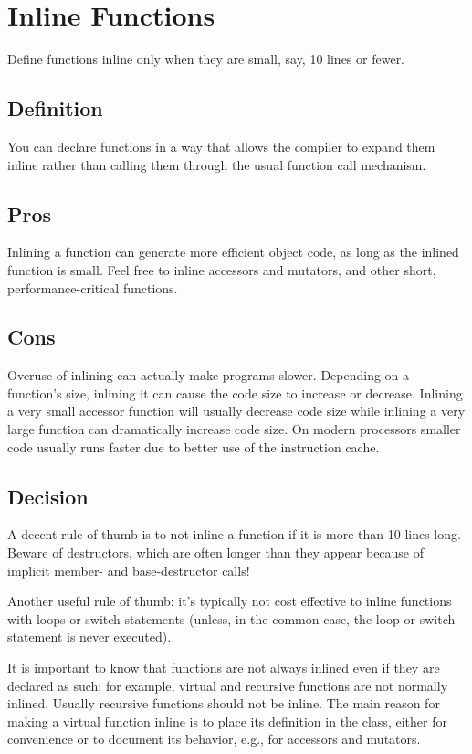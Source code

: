 
\section{Inline Functions}\label{sec:inline-functions}
Define functions inline only when they are small, say, 10 lines or fewer.
\subsection{Definition}
You can declare functions in a way that allows the compiler to expand them inline rather than calling them through the usual function call mechanism.
\subsection{Pros}
Inlining a function can generate more efficient object code, as long as the inlined function is small. Feel free to inline accessors and mutators, and other short, performance-critical functions.
\subsection{Cons}
Overuse of inlining can actually make programs slower. Depending on a function's size, inlining it can cause the code size to increase or decrease. Inlining a very small accessor function will usually decrease code size while inlining a very large function can dramatically increase code size. On modern processors smaller code usually runs faster due to better use of the instruction cache.
\subsection{Decision}
A decent rule of thumb is to not inline a function if it is more than 10 lines long. Beware of destructors, which are often longer than they appear because of implicit member- and base-destructor calls!

Another useful rule of thumb: it's typically not cost effective to inline functions with loops or switch statements (unless, in the common case, the loop or switch statement is never executed).

It is important to know that functions are not always inlined even if they are declared as such; for example, virtual and recursive functions are not normally inlined. Usually recursive functions should not be inline. The main reason for making a virtual function inline is to place its definition in the class, either for convenience or to document its behavior, e.g., for accessors and mutators.
